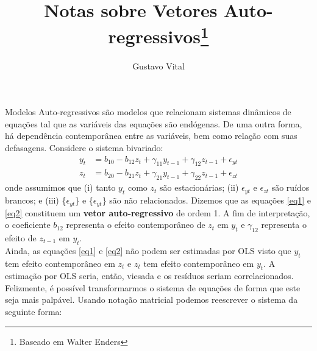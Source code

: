 \documentclass[11pt,a4paper]{article}
\author{Gustavo Vital}
\title{Notas sobre Vetores Auto-regressivos\footnote{Baseado em Walter Enders}}
\begin{document}
\maketitle

Modelos Auto-regressivos são modelos que relacionam sistemas dinâmicos de equações tal que as variáveis das equações são endógenas. De uma outra forma, há dependência contemporânea entre as variáveis, bem como relação com suas defasagens. Considere o sistema bivariado: 
\begin{align} \label{eq1}
y_t &= b_{10} - b_{12}z_t + \gamma_{11}y_{t-1} + \gamma_{12}z_{t-1} + \epsilon_{yt}\\ \label{eq2}
z_t &= b_{20} - b_{21}z_t + \gamma_{21}y_{t-1} + \gamma_{22}z_{t-1} + \epsilon_{zt} 
\end{align}
\noindent
onde assumimos que (i) tanto $y_t$ como $z_t$ são estacionárias; (ii) $\epsilon_{yt}$ e $\epsilon_{zt}$ são ruídos brancos; e (iii) \{$\epsilon_{yt}$\} e \{$\epsilon_{yt}$\} são não relacionados. Dizemos que as equações \ref{eq1} e \ref{eq2} constituem um \textbf{vetor auto-regressivo} de ordem 1. A fim de interpretação, o coeficiente $b_{12}$ representa o efeito contemporâneo de $z_t$ em $y_t$ e $\gamma_{12}$ representa o efeito de $z_{t-1}$ em $y_t$.\\

Ainda, as equações \ref{eq1} e \ref{eq2} não podem ser estimadas por OLS visto que $y_t$ tem efeito contemporâneo em $z_t$ e $z_t$ tem efeito contemporâneo em $y_t$. A estimação por OLS seria, então, viesada e os resíduos seriam correlacionados. Felizmente, é possível transformarmos o sistema de equações de forma que este seja mais palpável. Usando notação matricial podemos reescrever o sistema da seguinte forma:
\end{document}
